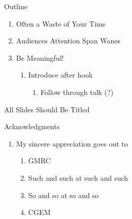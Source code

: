 \documentclass[aspectratio=169]{beamer}
\begin{document}
  \titleframe

  \begin{frame}{Outline}
    \begin{enumerate}
      \item Often a Waste of Your Time
      \item Audiences Attention Span Wanes
      \item Be Meaningful! \\[1mm]
      \begin{enumerate}
        \item Introduce after hook \\[2mm]
        \begin{enumerate}
          \item Follow through talk (?)
        \end{enumerate}
      \end{enumerate}
    \end{enumerate}
  \end{frame}
 
  \begin{frame}{All Slides Should Be Titled}
  \end{frame}
  
  \begin{frame}{Acknowledgments}
    \begin{enumerate}
      \item My sincere appreciation goes out to
      \begin{enumerate}
        \item GMRC
        \item Such and such at such and such
        \item So and so at so and so
        \item CGEM 
      \end{enumerate}
    \end{enumerate}
  \end{frame}

  \questionslide

\end{document}
